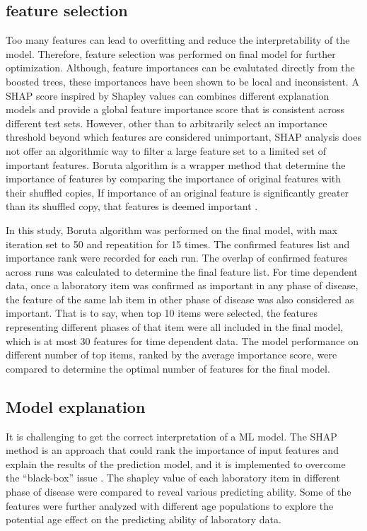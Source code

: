 \documentclass[final,1p,times,authoryear]{elsarticle}
\begin{document}
\subsection{feature selection}\label{FeatureSelection}

Too many features can lead to overfitting and reduce the interpretability of the model. Therefore, feature selection was performed on final model for further optimization. Although, feature importances can be evalutated directly from the boosted trees, these importances have been shown to be local and inconsistent. A SHAP score inspired by Shapley values can combines different explanation models and provide a global feature importance score that is consistent across different test sets. However, other than to arbitrarily select an importance threshold beyond which features are considered unimportant, SHAP analysis does not offer an algorithmic way to filter a large feature set to a limited set of important features. Boruta algorithm is a wrapper method that determine the importance of features by comparing the importance of original features with their shuffled copies, If importance of an original feature is significantly greater than its shuffled copy, that features is deemed important \citep{kursa2010feature}.

In this study, Boruta algorithm was performed on the final model, with max iteration set to 50 and repeatition for 15 times. The confirmed features list and importance rank were recorded for each run. The overlap of confirmed features across runs was calculated to determine the final feature list. For time dependent data, once a laboratory item was confirmed as important in any phase of disease, the feature of the same lab item in other phase of disease was also considered as important. That is to say, when top 10 items were selected, the features representing different phases of that item were all included in the final model, which is at most 30 features for time dependent data. The model performance on different number of top items, ranked by the average importance score, were compared to determine the optimal number of features for the final model.


\subsection{Model explanation}\label{ModelExplanationMethods}
It is challenging to get the correct interpretation of a ML model. The SHAP method is an approach that could rank the importance of input features and explain the results of the prediction model, and it is implemented to overcome the “black-box” issue \citep{lundberg2017unified}.
The shapley value of each laboratory item in different phase of disease were compared to reveal various predicting ability. 
Some of the features were further analyzed with different age populations to explore the potential age effect on the predicting ability of laboratory data.
\end{document}
